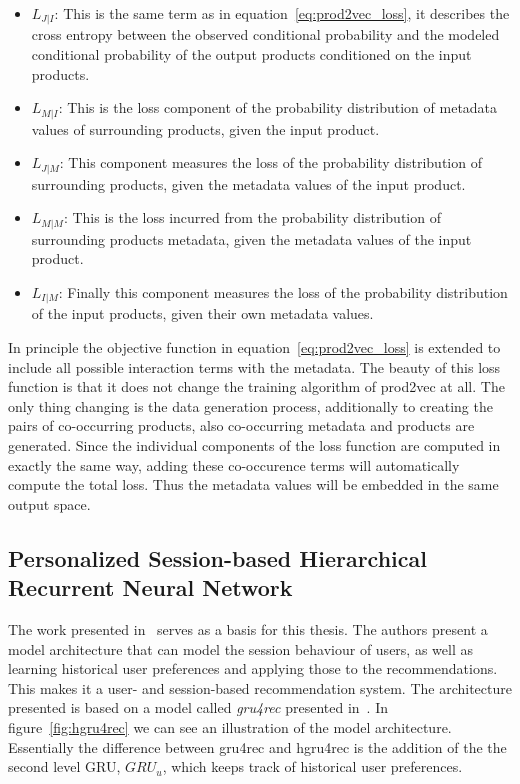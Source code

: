 \begin{itemize}
    \item $L_{J|I}$: This is the same term as in equation~\ref{eq:prod2vec_loss}, it describes the cross entropy between the observed conditional probability and the modeled conditional probability of the output products conditioned on the input products.
    \item $L_{M|I}$: This is the loss component of the probability distribution of metadata values of surrounding products, given the input product.
    \item $L_{J|M}$: This component measures the loss of the probability distribution of surrounding products, given the metadata values of the input product.
    \item $L_{M|M}$: This is the loss incurred from the probability distribution of surrounding products metadata, given the metadata values of the input product.
    \item $L_{I|M}$: Finally this component measures the loss of the probability distribution of the input products, given their own metadata values.
\end{itemize}
In principle the objective function in equation~\ref{eq:prod2vec_loss} is extended to include all possible interaction terms with the metadata.
The beauty of this loss function is that it does not change the training algorithm of prod2vec at all.
The only thing changing is the data generation process, additionally to creating the pairs of co-occurring products, also co-occurring metadata and products are generated.
Since the individual components of the loss function are computed in exactly the same way, adding these co-occurence terms will automatically compute the total loss.
Thus the metadata values will be embedded in the same output space.
\subsection{Personalized Session-based Hierarchical Recurrent Neural Network}
The work presented in~\cite{hierarchical} serves as a basis for this thesis.
The authors present a model architecture that can model the session behaviour of users, as well as learning historical user preferences and applying those to the recommendations.
This makes it a user- and session-based recommendation system.
The architecture presented is based on a model called \emph{gru4rec} presented in~\cite{gru4rec}.
In figure~\ref{fig:hgru4rec} we can see an illustration of the model architecture.
Essentially the difference between gru4rec and hgru4rec is the addition of the the second level GRU, $GRU_{u}$, which keeps track of historical user preferences.

